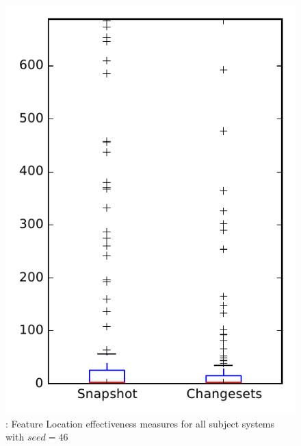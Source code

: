 
\begin{figure}
\centering
\includegraphics[height=0.4\textheight]{figures/flt_seed/rq1_overview_46}
\caption{\rone: Feature Location effectiveness measures for all subject systems with $seed=46$}
\label{fig:flt_seed:rq1:overview}
\end{figure}
